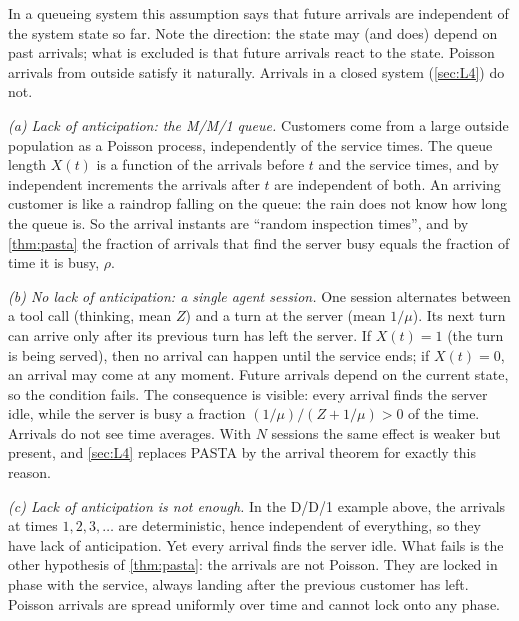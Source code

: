 In a queueing system this assumption says that future arrivals are independent of the
system state so far. Note the direction: the state may (and does) depend on past
arrivals; what is excluded is that future arrivals react to the state. Poisson arrivals
from outside satisfy it naturally. Arrivals in a closed system (\cref{sec:L4}) do not.

\begin{example}\label{L1:ex:lookahead}
\emph{(a) Lack of anticipation: the M/M/1 queue.} Customers come from a large outside
population as a Poisson process, independently of the service times. The queue length
$X(t)$ is a function of the arrivals before $t$ and the service times, and by
independent increments the arrivals after $t$ are independent of both. An arriving
customer is like a raindrop falling on the queue: the rain does not know how long the
queue is. So the arrival instants are ``random inspection times'', and by
\cref{thm:pasta} the fraction of arrivals that find the server busy equals the fraction
of time it is busy, $\rho$.

\emph{(b) No lack of anticipation: a single agent session.} One session alternates
between a tool call (thinking, mean $Z$) and a turn at the server (mean $1/\mu$). Its
next turn can arrive only after its previous turn has left the server. If $X(t)=1$
(the turn is being served), then no arrival can happen until the service ends; if
$X(t)=0$, an arrival may come at any moment. Future arrivals depend on the current
state, so the condition fails. The consequence is visible: every arrival finds the
server idle, while the server is busy a fraction $(1/\mu)/(Z+1/\mu)>0$ of the time.
Arrivals do not see time averages. With $N$ sessions the same effect is weaker but
present, and \cref{sec:L4} replaces PASTA by the arrival theorem for exactly this
reason.

\emph{(c) Lack of anticipation is not enough.} In the D/D/1 example above, the arrivals
at times $1,2,3,\dots$ are deterministic, hence independent of everything, so they have
lack of anticipation. Yet every arrival finds the server idle. What fails is the other
hypothesis of \cref{thm:pasta}: the arrivals are not Poisson. They are locked in phase
with the service, always landing after the previous customer has left. Poisson
arrivals are spread uniformly over time and cannot lock onto any phase.
\end{example}

